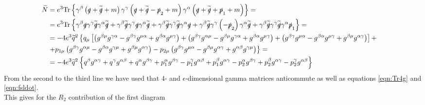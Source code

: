 \begin{align*}
\widetilde{N} & = e^3 \mathrm{Tr} \left\lbrace \gamma^{\beta} \left( \slashed{q} + \widetilde{\slashed{q}} + m \right) \gamma^{\gamma} \left( \slashed{q} + \widetilde{\slashed{q}} - \slashed{p}_2 + m \right) \gamma^{\alpha} \left( \slashed{q} + \widetilde{\slashed{q}} + \slashed{p}_1 + m \right) \right\rbrace = & \\
& = e^3 \mathrm{Tr} \left\lbrace \gamma^{\beta} \slashed{q} \gamma^{\gamma} \widetilde{\slashed{q}} \gamma^{\alpha} \widetilde{\slashed{q}} + \gamma^{\beta} \widetilde{\slashed{q}} \gamma^{\gamma} \slashed{q} \gamma^{\alpha} \widetilde{\slashed{q}} + \gamma^{\beta} \widetilde{\slashed{q}} \gamma^{\gamma} \widetilde{\slashed{q}} \gamma^{\alpha} \slashed{q} + \gamma^{\beta} \widetilde{\slashed{q}} \gamma^{\gamma} \left( - \slashed{p}_2 \right) \gamma^{\alpha} \widetilde{\slashed{q}} + \gamma^{\beta} \widetilde{\slashed{q}} \gamma^{\gamma} \widetilde{\slashed{q}} \gamma^{\alpha} \slashed{p}_1 \right\rbrace = & \\
& = - 4e^3 \widetilde{q}^2 \left\lbrace q_{\mu} \left[ \left( g^{\beta\mu}g^{\gamma\alpha} - g^{\beta\gamma}g^{\mu\alpha} + g^{\beta\alpha}g^{\mu\gamma} \right) + \left( g^{\beta\gamma}g^{\alpha\mu} - g^{\beta\mu}g^{\gamma\alpha} + g^{\beta\alpha}g^{\mu\gamma} \right) + \left( g^{\beta\gamma}g^{\mu\alpha} - g^{\beta\alpha}g^{\mu\gamma} + g^{\beta\mu}g^{\alpha\gamma} \right) \right] + \right. & \\ 
& \left. + p_{1\mu} \left( g^{\beta\gamma}g^{\alpha\mu} - g^{\beta\alpha}g^{\gamma\mu} + g^{\beta\mu}g^{\alpha\gamma} \right) - p_{2\mu} \left( g^{\beta\gamma}g^{\mu\alpha} - g^{\beta\mu}g^{\alpha\gamma} + g^{\alpha\beta}g^{\gamma\mu} \right) \right\rbrace = & \\
& = -4e^3 \widetilde{q}^2 \left\lbrace q^{\beta}g^{\alpha\gamma} + q^{\gamma}g^{\alpha\beta} + q^{\alpha}g^{\beta\gamma} + p_1^{\alpha}g^{\beta\gamma} - p_1^{\gamma}g^{\alpha\beta} + p_1^{\beta}g^{\alpha\gamma} - p_2^{\alpha}g^{\beta\gamma} + p_2^{\beta}g^{\alpha\gamma} - p_2^{\gamma}g^{\alpha\beta} \right\rbrace &
\end{align*}
From the second to the third line we have used that 4- and $\epsilon$-dimensional gamma matrices anticommute as well as equations \ref{eqn:Tr4g} and \ref{eqn:fsldot}. \\
This gives for the $R_2$ contribution of the first diagram
